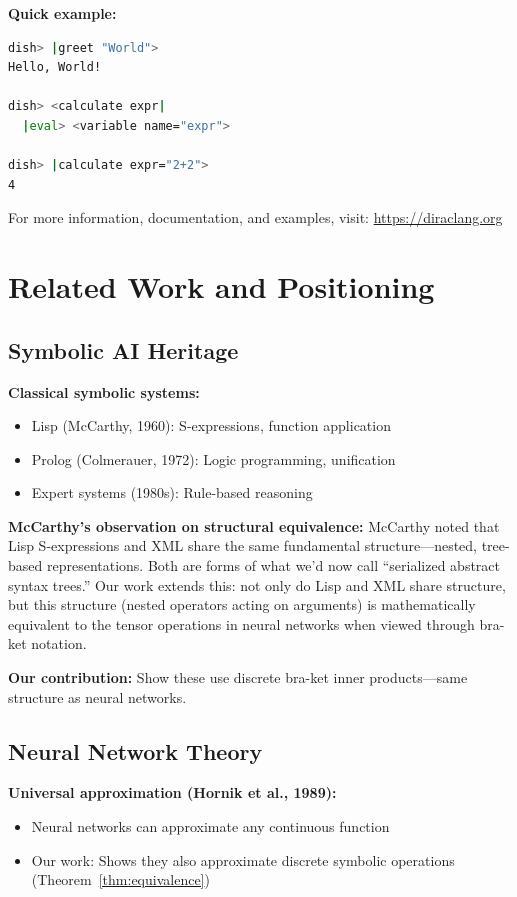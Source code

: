 \documentclass[11pt,a4paper]{article}
\theoremstyle{definition}
\begin{document}
\textbf{Quick example:}
\begin{lstlisting}[language=bash]
dish> |greet "World">
Hello, World!

dish> <calculate expr|
  |eval> <variable name="expr">

dish> |calculate expr="2+2">
4
\end{lstlisting}

For more information, documentation, and examples, visit: \url{https://diraclang.org}

\section{Related Work and Positioning}

\subsection{Symbolic AI Heritage}

\textbf{Classical symbolic systems:}
\begin{itemize}
\item Lisp (McCarthy, 1960): S-expressions, function application
\item Prolog (Colmerauer, 1972): Logic programming, unification
\item Expert systems (1980s): Rule-based reasoning
\end{itemize}

\textbf{McCarthy's observation on structural equivalence:}
McCarthy noted that Lisp S-expressions and XML share the same fundamental structure---nested, tree-based representations. Both are forms of what we'd now call ``serialized abstract syntax trees.'' Our work extends this: not only do Lisp and XML share structure, but this structure (nested operators acting on arguments) is mathematically equivalent to the tensor operations in neural networks when viewed through bra-ket notation.

\textbf{Our contribution:} Show these use discrete bra-ket inner products---same structure as neural networks.

\subsection{Neural Network Theory}

\textbf{Universal approximation (Hornik et al., 1989):}
\begin{itemize}
\item Neural networks can approximate any continuous function
\item Our work: Shows they also approximate discrete symbolic operations (Theorem~\ref{thm:equivalence})
\end{itemize}
\end{document}
